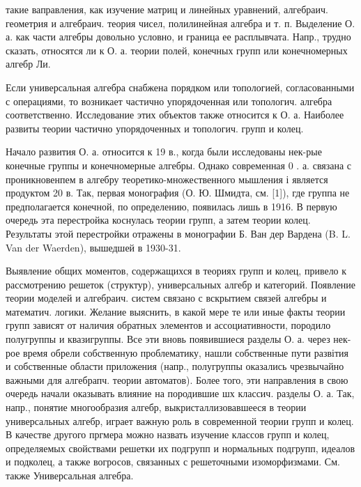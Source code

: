 \documentclass[10pt]{article}
\begin{document}
такие ваправления, как изучение матриц и линейных уравнений, алгебраич. геометрия и алгебраич. теория чисел, полилинейная алгебра и т. п. Выделение О. а. как части алгебры довольно условно, и граница ее расплывчата. Напр., трудно сказать, относятся ли к О. а. теории полей, конечных групп или конечномерных алгебр Ли.



Если универсальная алгебра снабжена порядком или топологией, согласованными с операциями, то возникает частично упорядоченная или топологич. алгебра соответственно. Исследование этих объектов также относится к О. а. Наиболее развиты теории частично упорядоченных и топологич. групп и колец.



Начало развития О. а. относится к 19 в., когда были исследованы нек-рые конечные группы и конечномерные алгебры. Однако современная 0 . а. связана с проникновенпем в алгебру теоретико-множественного мышления і является продуктом 20 в. Так, первая монография (О. Ю. Шмидта, см. [1]), где группа не предполагается конечной, по определению, появилась лишь в 1916. В первую очередь эта перестройка коснулась теории групп, а затем теории колец. Результаты этой перестройки отражены в монографии Б. Ван дер Вардена (B. L. Van der Waerden), вышедшей в 1930-31.



Выявление общих моментов, содержащихся в теориях групп и колец, привело к рассмотрению решеток (структур), универсальных алгебр и категорий. Появление теории моделей и алгебраич. систем связано с вскрытием связей алгебры и математич. логики. Желание выяснить, в какой мере те или иные факты теории групп зависят от наличия обратных элементов и ассоциативности, породило полугруппы и квазигруппы. Все эти вновь появившиеся разделы О. а. через нек-рое время обрели собственную проблематику, нашли собственные пути развітия и собственные области приложения (напр., полугруппы оказались чрезвычайно важными для алгебрапч. теории автоматов). Более того, эти направления в свою очередь начали оказывать влияние на породившие шх классич. разделы О. а. Так, напр., понятие многообразия алгебр, выкристаллизовавшееся в теории универсальных алгебр, играет важную роль в современной теории групп и колец. В качестве другого пргмера можно назвать изучение классов групп и колец, определяемых свойствами решетки их подгрупп и нормальных подгрупп, идеалов и подколец, а также вогросов, связанных с решеточными изоморфизмами. См. также Универсальная алгебра.
\end{document}
